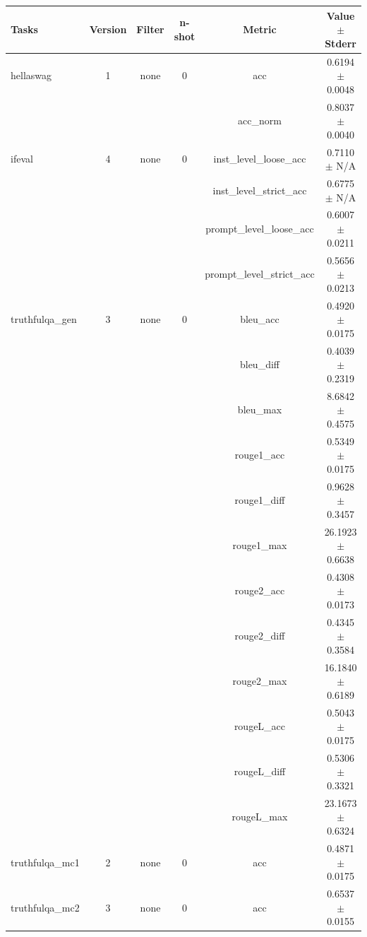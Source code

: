 \documentclass{ifacconf}
\begin{document}
\begin{strip}
\begin{minipage}{\textwidth}
			\begin{table}[H]
				\centering
				\begin{tabular}{|l|c|c|c|c|c|}
					\hline
					\textbf{Tasks} & \textbf{Version} & \textbf{Filter} & \textbf{n-shot} & \textbf{Metric} & \textbf{Value} $\pm$ \textbf{Stderr} \\ \hline
					hellaswag & 1 & none & 0 & acc & 0.6194 $\pm$ 0.0048 \\ \hline
					& & & & acc\_norm & 0.8037 $\pm$ 0.0040 \\ \hline
					ifeval & 4 & none & 0 & inst\_level\_loose\_acc & 0.7110 $\pm$ N/A \\ \hline
					& & & & inst\_level\_strict\_acc & 0.6775 $\pm$ N/A \\ \hline
					& & & & prompt\_level\_loose\_acc & 0.6007 $\pm$ 0.0211 \\ \hline
					& & & & prompt\_level\_strict\_acc & 0.5656 $\pm$ 0.0213 \\ \hline
					truthfulqa\_gen & 3 & none & 0 & bleu\_acc & 0.4920 $\pm$ 0.0175 \\ \hline
					& & & & bleu\_diff & 0.4039 $\pm$ 0.2319 \\ \hline
					& & & & bleu\_max & 8.6842 $\pm$ 0.4575 \\ \hline
					& & & & rouge1\_acc & 0.5349 $\pm$ 0.0175 \\ \hline
					& & & & rouge1\_diff & 0.9628 $\pm$ 0.3457 \\ \hline
					& & & & rouge1\_max & 26.1923 $\pm$ 0.6638 \\ \hline
					& & & & rouge2\_acc & 0.4308 $\pm$ 0.0173 \\ \hline
					& & & & rouge2\_diff & 0.4345 $\pm$ 0.3584 \\ \hline
					& & & & rouge2\_max & 16.1840 $\pm$ 0.6189 \\ \hline
					& & & & rougeL\_acc & 0.5043 $\pm$ 0.0175 \\ \hline
					& & & & rougeL\_diff & 0.5306 $\pm$ 0.3321 \\ \hline
					& & & & rougeL\_max & 23.1673 $\pm$ 0.6324 \\ \hline
					truthfulqa\_mc1 & 2 & none & 0 & acc & 0.4871 $\pm$ 0.0175 \\ \hline
					truthfulqa\_mc2 & 3 & none & 0 & acc & 0.6537 $\pm$ 0.0155 \\ \hline
				\end{tabular}
				\label{tab:qwen25_q5km}
			\end{table}
			

\end{minipage}
\end{strip}
\end{document}
